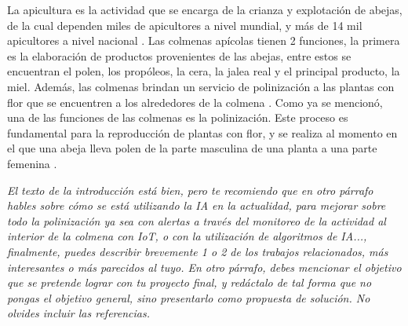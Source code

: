 



La apicultura es la actividad que se encarga de la crianza y explotación de abejas, de la cual dependen miles de apicultores a nivel mundial, y más de 14 mil apicultores a nivel nacional \cite{data_mexico_2023a}.
Las colmenas apícolas tienen 2 funciones, la primera es la elaboración de productos provenientes de las abejas, entre estos se encuentran el polen, los propóleos, la cera, la jalea real y el principal producto, la miel. Además, las colmenas brindan un servicio de polinización a las plantas con flor que se encuentren a los alrededores de la colmena \cite{bradbear_2005}.
Como ya se mencionó, una de las funciones de las colmenas es la polinización. Este proceso es fundamental para la reproducción de plantas con flor, y se realiza al momento en el que una abeja lleva polen de la parte masculina de una planta a una parte femenina \cite{bradbear_2005}.

\textit{El texto de la introducción está bien, pero te recomiendo que en otro párrafo hables sobre cómo se está utilizando la IA en la actualidad, para mejorar sobre todo la polinización ya sea con alertas a través del monitoreo de la actividad al interior de la colmena con IoT, o con la utilización de algoritmos de IA..., finalmente, puedes describir brevemente 1 o 2 de los trabajos relacionados, más interesantes o más parecidos al tuyo. En otro párrafo, debes mencionar el objetivo que se pretende lograr con tu proyecto final, y redáctalo de tal forma que no pongas el objetivo general, sino presentarlo como propuesta de solución. No olvides incluir las referencias.}
